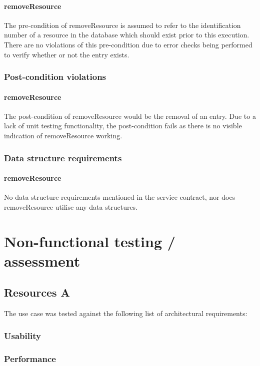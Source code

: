 \documentclass[a4paper]{article}
\begin{document}
\paragraph{removeResource}
The pre-condition of removeResource is assumed to refer to the identification number of a resource in the database which should exist prior to this execution. There are no violations of this pre-condition due to error checks being performed to verify whether or not the entry exists.

\subsubsection {Post-condition violations}

\paragraph{removeResource}
The post-condition of removeResource would be the removal of an entry. Due to a lack of unit testing functionality, the post-condition fails as there is no visible indication of removeResource working.

\subsubsection {Data structure requirements}

\paragraph{removeResource}
No data structure requirements mentioned in the service contract, nor does removeResource utilise any data structures.

\section {Non-functional testing / assessment}
\subsection {Resources A}
The use case was tested against the following list of architectural requirements:
\subsubsection {Usability}
\subsubsection {Performance}
\end{document}
